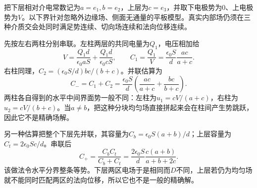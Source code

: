 \begin{solution}
把下层相对介电常数记为$a=e_1,b=e_2$，上层为$c=e_3$，并取下电极势为$0$、上电极势为$V$。以下界针对忽略外边缘场、侧面无通量的平板模型。真实内部场仍须在三种介质交会处同时满足势连续、切向场连续和法向位移连续。

先按左右两柱分别串联。左柱两层的共同电量为$Q_1$，电压相加给
\[V=\frac{Q_1d}{\epsilon_0aS}+\frac{Q_1d}{\epsilon_0cS},\qquad
C_1=\frac{Q_1}{V}=\frac{\epsilon_0S}{d}\frac{ac}{a+c}.
\]
右柱同理，$C_2=(\epsilon_0S/d)bc/(b+c)$。并联估算为
\[C_-=C_1+C_2=\frac{\epsilon_0S}{d}\left(\frac{ac}{a+c}+\frac{bc}{b+c}\right).
\]
两柱各自得到的水平中间界面势一般不同：左柱为$u_1=cV/(a+c)$，右柱为$u_2=cV/(b+c)$。当$a\ne b$，把这种分块均匀场直接拼起来会在柱间产生势跳跃，因此它不是精确场解。

另一种估算把整个下层先并联，其容量为$C_b=\epsilon_0S(a+b)/d$；上层容量为$C_t=2\epsilon_0Sc/d$。串联后
\[C_+=\frac{C_bC_t}{C_b+C_t}
=\frac{2\epsilon_0S}{d}\frac{c(a+b)}{a+b+2c}.
\]
该做法令水平分界整条等势。下层两区电场于是相同而$D$不同，上层若仍为均匀场就不能同时匹配两区的法向位移，所以它也不是一般的精确解。


\end{solution}
